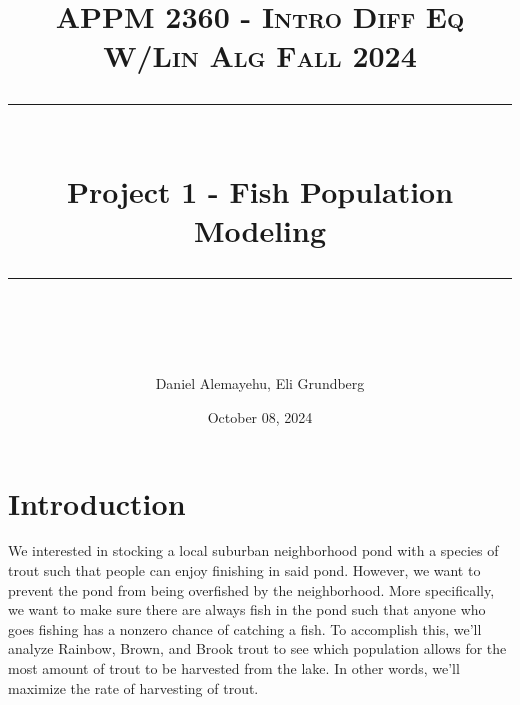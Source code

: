 \documentclass[letterpaper,12pt]{article}
\title{
\normalfont \normalsize 
\textsc{APPM 2360 - Intro Diff Eq W/Lin Alg \hfill Fall 2024} \\
[10pt] 
\rule{\linewidth}{0.5pt} \\[6pt] 
\huge Project 1 - Fish Population Modeling \\
\rule{\linewidth}{2pt}  \\[10pt]
}
\date{October 08, 2024}
\author{Daniel Alemayehu, Eli Grundberg}
\begin{document}
\begin{titlingpage}
\maketitle
\end{titlingpage}
\newpage
\tableofcontents
\newpage

\section{Introduction}
We interested in stocking a local suburban neighborhood pond with a species of trout such that people can enjoy finishing in said pond. 
However, we want to prevent the pond from being overfished by the neighborhood.
More specifically, we want to make sure there are always fish in the pond such that anyone who goes fishing has a nonzero chance of catching a fish. 
To accomplish this, we'll analyze Rainbow, Brown, and Brook trout to see which population allows for the most amount of trout to be harvested from the lake.
In other words, we'll maximize the rate of harvesting of trout.
\end{document}
